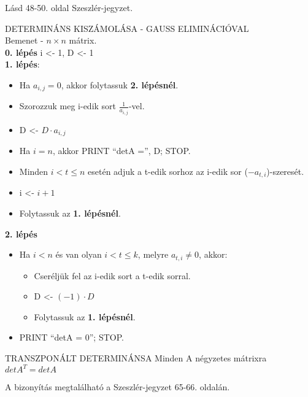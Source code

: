 \begin{bizonyitas}{}
Lásd 48-50. oldal Szeszlér-jegyzet.
\end{bizonyitas}

\begin{tetel}{DETERMINÁNS KISZÁMOLÁSA -  GAUSS ELIMINÁCIÓVAL\\
Bemenet - $n\times n$ mátrix}.\\
\textbf{0. lépés}
i <- 1, D <- 1\\
\textbf{1. lépés}:
\begin{itemize}
\item Ha $a_{i,j} = 0$, akkor folytassuk \textbf{2. lépésnél}.
\item Szorozzuk meg i-edik sort $\frac{1}{a_{i,j}}$-vel.
\item D <- $D \cdot a_{i,j}$
\item Ha $i = n$, akkor PRINT ``detA ='', D; STOP.
\item Minden $i < t \leq n$ esetén adjuk a t-edik sorhoz az i-edik sor ($-a_{t,i}$)-szeresét.
\item i <- $i+1$
\item Folytassuk az \textbf{1. lépésnél}.
\end{itemize}
\textbf{2. lépés}
\begin{itemize}
\item Ha $i < n$ és van olyan $i < t \leq k$, melyre $a_{t,i} \neq 0$, akkor:
\begin{itemize}
\item Cseréljük fel az i-edik sort a t-edik sorral.
\item D <- $(-1)\cdot D$
\item Folytassuk az \textbf{1. lépésnél}.
\end{itemize}
\item PRINT ``detA = 0''; STOP.
\end{itemize}
\end{tetel}

\begin{tetel}{TRANSZPONÁLT DETERMINÁNSA}
Minden A négyzetes mátrixra $detA^T = detA$
\end{tetel}

\begin{bizonyitas}{}
A bizonyítás megtalálható a Szeszlér-jegyzet 65-66. oldalán.
\end{bizonyitas}

